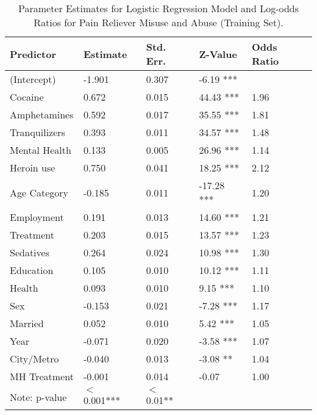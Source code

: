 \documentclass[sigconf]{acmart}
\begin{document}
\begin{table}
  \caption{Parameter Estimates for Logistic Regression Model and Log-odds 
  Ratios for Pain Reliever Misuse and Abuse (Training Set).}
  \label{tab:freq}
  \begin{tabular}{lllll}
    \toprule
    Predictor&  Estimate& Std. Err.& Z-Value & Odds Ratio \\    
    \midrule
    (Intercept)   & -1.901 &  0.307 &  -6.19 *** &   \\
    Cocaine       &  0.672 &  0.015 &  44.43 *** & 1.96  \\
    Amphetamines  &  0.592 &  0.017 &  35.55 *** & 1.81  \\
    Tranquilizers &  0.393 &  0.011 &  34.57 *** & 1.48  \\
    Mental Health &  0.133 &  0.005 &  26.96 *** & 1.14  \\
    Heroin use    &  0.750 &  0.041 &  18.25 *** & 2.12  \\
    Age Category  & -0.185 &  0.011 & -17.28 *** & 1.20  \\
    Employment    &  0.191 &  0.013 &  14.60 *** & 1.21  \\
    Treatment     &  0.203 &  0.015 &  13.57 *** & 1.23  \\
    Sedatives     &  0.264 &  0.024 &  10.98 *** & 1.30  \\
    Education     &  0.105 &  0.010 &  10.12 *** & 1.11  \\
    Health        &  0.093 &  0.010 &   9.15 *** & 1.10  \\
    Sex           & -0.153 &  0.021 &  -7.28 *** & 1.17  \\
    Married       &  0.052 &  0.010 &   5.42 *** & 1.05  \\
    Year          & -0.071 &  0.020 &  -3.58 *** & 1.07  \\
    City/Metro    & -0.040 &  0.013 &  -3.08 **  & 1.04  \\
    MH Treatment  & -0.001 &  0.014 &  -0.07     & 1.00  \\
    \bottomrule 
    Note: p-value& $<$ 0.001***  & $<$ 0.01** &  &   
  \end{tabular}
\end{table}


 
\end{document}
